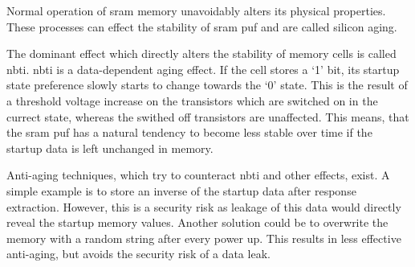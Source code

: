 Normal operation of \gls{sram} memory unavoidably alters its physical properties. These processes can effect the stability of \gls{sram} \gls{puf} and are called silicon aging.

The dominant effect which directly alters the stability of memory cells is called \gls{nbti}. \gls{nbti} is a data-dependent aging effect. If the cell stores a `1' bit, its startup state preference slowly starts to change towards the `0' state. This is the result of a threshold voltage increase on the transistors which are switched on in the currect state, whereas the swithed off transistors are unaffected. This means, that the \gls{sram} \gls{puf} has a natural tendency to become less stable over time if the startup data is left unchanged in memory.\cite{Roelke2018}

Anti-aging techniques, which try to counteract \gls{nbti} and other effects, exist. A simple example is to store an inverse of the startup data after response extraction. However, this is a security risk as leakage of this data would directly reveal the startup memory values. Another solution could be to overwrite the memory with a random string after every power up. This results in less effective anti-aging, but avoids the security risk of a data leak.\cite{Maes2014}




